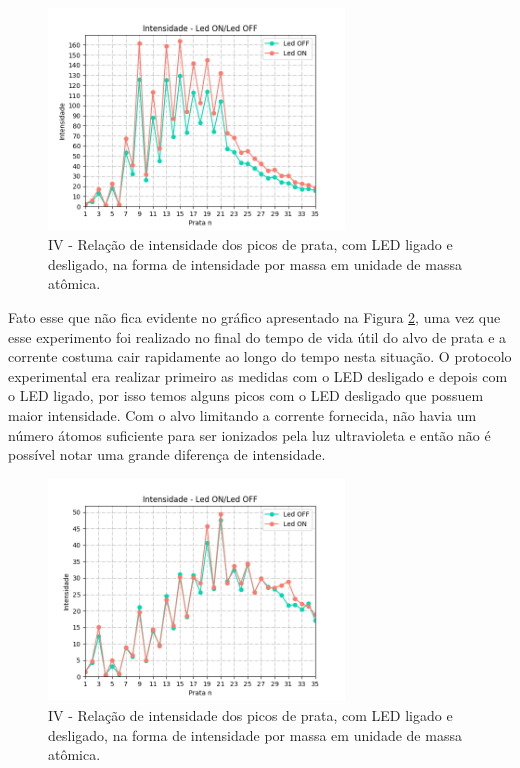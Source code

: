   \begin{figure}
  \centering  
  \includegraphics[width=0.7\textwidth]{exp_04/LED_ON_Led_OFF_intensidade_prata_N_.png}
  \caption{IV - Relação de intensidade dos picos de prata, com LED ligado e desligado, na forma de intensidade por massa em unidade de massa atômica.}
  \label{fig:exp_04_picos_LEDONOFF_N}
\end{figure}

Fato esse que não fica evidente no gráfico apresentado na Figura \ref{fig:exp_03_picos_LEDONOFF_N}, uma vez que esse experimento foi realizado no final do tempo de vida útil do alvo de prata e a corrente costuma cair rapidamente ao longo do tempo nesta situação. O protocolo experimental era realizar primeiro as medidas com o LED desligado e depois com o LED ligado, por isso temos alguns picos com o LED desligado que possuem maior intensidade. Com o alvo limitando a corrente fornecida, não havia um número átomos suficiente para ser ionizados pela luz ultravioleta e então não é possível notar uma grande diferença de intensidade.  

\begin{figure}
  \centering  
  \includegraphics[width=0.7\textwidth]{exp_03/LED_ON_Led_OFF_intensidade_prata_N_.png}
  \caption{IV - Relação de intensidade dos picos de prata, com LED ligado e desligado, na forma de intensidade por massa em unidade de massa atômica.}
  \label{fig:exp_03_picos_LEDONOFF_N}
\end{figure}